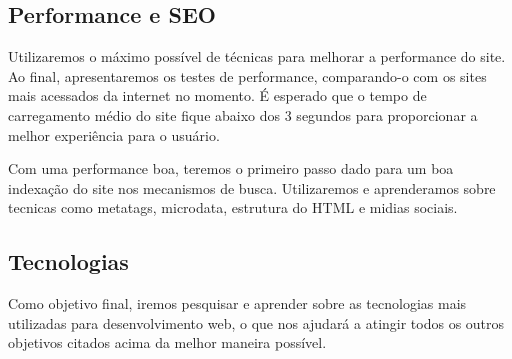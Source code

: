 \subsection{Performance e SEO}

Utilizaremos o máximo possível de técnicas para melhorar a performance do site. Ao final, apresentaremos os testes de performance, comparando-o com os sites mais acessados da internet no momento. É esperado que o tempo de carregamento médio do site fique abaixo dos 3 segundos para proporcionar a melhor experiência para o usuário.

Com uma performance boa, teremos o primeiro passo dado para um boa indexação do site nos mecanismos de busca. Utilizaremos e aprenderamos sobre tecnicas como metatags, microdata, estrutura do HTML e midias sociais.

\subsection{Tecnologias}

Como objetivo final, iremos pesquisar e aprender sobre as tecnologias mais utilizadas para desenvolvimento web, o que nos ajudará a atingir todos os outros objetivos citados acima da melhor maneira possível.
